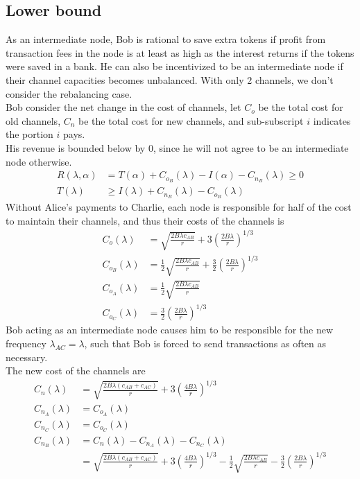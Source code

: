 \documentclass[12pt]{article}
\theoremstyle{plain}
\theoremstyle{remark}
\theoremstyle{definition}
\renewcommand{\geq}{\geqslant}
\renewcommand{\geq}{\geqslant}
\begin{document}
\subsection{Lower bound}
As an intermediate node, Bob is rational to save extra tokens if profit from transaction fees in the node is at least as high as the interest returns if the tokens were saved in a bank. He can also be incentivized to be an intermediate node if their channel capacities becomes unbalanced. With only 2 channels, we don't consider the rebalancing case.
\\ Bob consider the net change in the cost of channels, let $C_o$ be the total cost for old channels, $C_n$ be the total cost for new channels, and sub-subscript $i$ indicates the portion $i$ pays. 
\\ His revenue is bounded below by 0, since he will not agree to be an intermediate node otherwise. 
\begin{align}
  R(\lambda,\alpha) & =T(\alpha) + C_{o_B}(\lambda) - I(\alpha) - C_{n_B}(\lambda)\geq 0\\
  T(\lambda) & \geq  I(\lambda) + C_{n_B}(\lambda) - C_{o_B}(\lambda)
\end{align}
Without Alice's payments to Charlie, each node is responsible for half of the cost to maintain their channels, and thus their costs of the channels is
\begin{align}
  C_{o}(\lambda)&=\sqrt{\frac{2B\lambda c_{AB}}{r}} + 3(\frac{2B\lambda}{r})^{1/3}\\
  C_{o_B}(\lambda)&=\frac{1}{2}\sqrt{\frac{2B\lambda c_{AB}}{r}} + \frac{3}{2}(\frac{2B\lambda}{r})^{1/3}\\
  C_{o_A}(\lambda)&=\frac{1}{2}\sqrt{\frac{2B\lambda c_{AB}}{r}}\\
  C_{o_C}(\lambda) &= \frac{3}{2}(\frac{2B\lambda}{r})^{1/3}
\end{align}
Bob acting as an intermediate node causes him to be responsible for the new frequency $\lambda_{AC}=\lambda$, such that Bob is forced to send transactions as often as necessary. 
\\ The new cost of the channels are 
\begin{align}
  C_{n}(\lambda)&=\sqrt{\frac{2B\lambda (c_{AB}+ c_{AC})}{r}} + 3(\frac{4B\lambda}{r})^{1/3}\\
  C_{n_A}(\lambda)&=C_{o_A}(\lambda) \\
  C_{n_C}(\lambda)&= C_{o_C}(\lambda)\\
  C_{n_B}(\lambda)&=C_{n}(\lambda)-C_{n_A}(\lambda)-C_{n_C}(\lambda) \\
  & = \sqrt{\frac{2B\lambda (c_{AB}+ c_{AC})}{r}} + 3(\frac{4B\lambda}{r})^{1/3} - \frac{1}{2}\sqrt{\frac{2B\lambda c_{AB}}{r}}- \frac{3}{2}(\frac{2B\lambda}{r})^{1/3}
\end{align}
\end{document}
